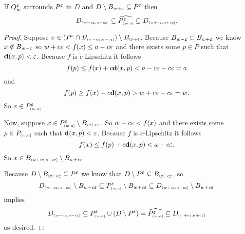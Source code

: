 \begin{lemma}\label{lem:p_interleave}
 If $Q_w^\e$ surrounds $P^\e$ in $D$ and $D\setminus B_{w + \e}\subseteq P^\e$ then
 \[ D\subi{w-c\e, a-c\e} \subseteq \ext{P\subi{w, a}^\e}\subseteq D\subi{w+c\e,a+c\e}.\]
\end{lemma}
\begin{proof}
  Suppose $x\in (P^\e\cap B\subi{w-c\e, a-c\e})\setminus B_{w+\e}$.
  Because $B_{w-\e}\subset B_{w+\e}$ we know $x\notin B_{w-\e}$ so $w+c\e < f(x)\leq a-c\e$ and there exists some $p\in P$ such that $\dist(x, p) < \e$.
  Because $f$ is $c$-Lipschitz it follows
  \[ f(p)\leq f(x) + c\dist(x, p) < a - c\e + c\e = a\]
  and
  \[ f(p)\geq f(x) - c\dist(x, p) > w+c\e-c\e = w.\]
  So $x\in P\subi{w,a}^\e$.

  Now, suppose $x\in P\subi{w,a}^\e\setminus B_{w+c\e}$.
  So $w+c\e < f(x)$ and there exists some $p\in P\subi{w,a}$ such that $\dist(x,p) < \e$.
  Because $f$ is $c$-Lipschitz it follows
  \[ f(x) \leq f(p) + c\dist(x,p) < a + c\e.\]
  So $x\in B\subi{w+c\e, a+c\e}\setminus B_{w+c\e}$.

  Because $D\setminus B_{w+c\e}\subseteq P^\e$ we know that $D\setminus P^\e \subseteq B_{w+c\e}$, so
  \[D\subi{w-c\e, a-c\e}\setminus B_{w+c\e} \subseteq P\subi{w,a}^\e\setminus B_{w+c\e}\subseteq D\subi{w+c\e, a+c\e}\setminus B_{w+c\e}\]
  implies
  \[ D\subi{w-c\e, a-c\e}\subseteq P\subi{w,a}^\e\cup (D\setminus P^\e) = \ext{P\subi{w,a}^\e} \subseteq D\subi{w+c\e, a+c\e} \]
  as desired.
\end{proof}


